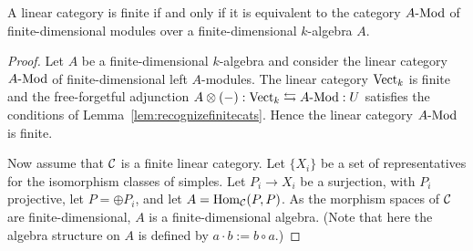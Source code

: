 \documentclass{amsart}
\begin{document}
\begin{proposition} \label{prop:finitelinearcatsasmodules}
A linear category is finite if and only if it is equivalent to the category $\Mod{A}{}$ of finite-dimensional modules over a finite-dimensional $k$-algebra $A$.
\end{proposition}
\begin{proof}   
	Let $A$ be a finite-dimensional $k$-algebra and consider the linear category $\Mod{A}{}$ of finite-dimensional left $A$-modules. The linear category $\mathrm{Vect}_k$ is finite and the  free-forgetful adjunction $A\otimes(-): \Vect_k \leftrightarrows \Mod{A}{}: U$ satisfies the conditions of Lemma~\ref{lem:recognizefinitecats}. Hence the linear category $\Mod{A}{}$ is finite.
	
	
	
	
	Now assume that $\mathcal C$ is a finite linear category. Let $\{X_i\}$ be a set of representatives for the isomorphism classes of simples. Let $P_i \to X_i$ be a surjection, with $P_i$ projective, let $P = \oplus P_i$, and let $A = \operatorname{Hom}_{\mathcal C}(P,P)$. As the morphism spaces of $\mathcal C$ are finite-dimensional, $A$ is a finite-dimensional algebra.  (Note that here the algebra structure on $A$ is defined by $a \cdot b := b \circ a$.)
	

\end{proof}
\end{document}
